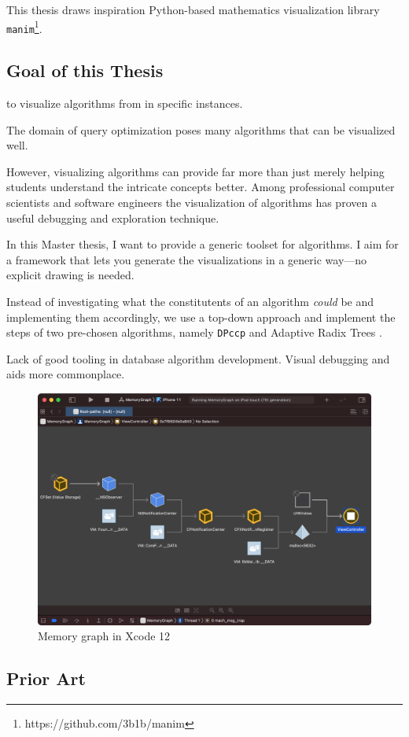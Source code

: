 This thesis draws inspiration Python-based mathematics visualization library \texttt{manim}\footnote{https://github.com/3b1b/manim}.

\subsection{Goal of this Thesis}
to visualize algorithms from in specific instances.

The domain of query optimization poses many algorithms that can be visualized well.

However, visualizing algorithms can provide far more than just merely helping students understand the intricate concepts better.
Among professional computer scientists and software engineers the visualization of algorithms has proven a useful debugging and exploration technique.

In this Master thesis, I want to provide a generic toolset for algorithms. I aim for a framework that lets you generate the visualizations in a generic way—no explicit drawing is needed.

Instead of investigating what the constitutents of an algorithm \textit{could} be and
implementing them accordingly, we use a top-down approach and implement the steps of
two pre-chosen algorithms, namely \texttt{DPccp} \cite{moerkotte2006analysis} and Adaptive Radix Trees \cite{leis2013adaptive}.

Lack of good tooling in database algorithm development.
Visual debugging and aids more commonplace.
\begin{figure}
    \includegraphics[width=\textwidth]{img/memoryGraph.png}
    \caption{Memory graph in Xcode 12}
\end{figure}


\subsection{Prior Art}
